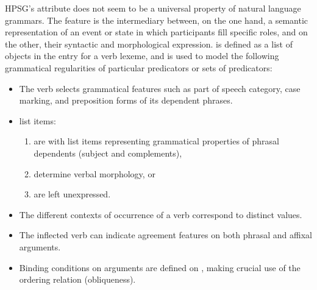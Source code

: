 \documentclass[output=paper
 	        ,biblatex
                ,babelshorthands
                ,newtxmath
                ,draftmode
                ,colorlinks, citecolor=brown
]{langscibook}
\begin{document}

HPSG's \argst attribute does not seem to be a universal property of natural
language grammars.  The \argst feature is the intermediary between, on
the one hand, a semantic representation of an event or state in which
participants fill specific roles, and on the other, their syntactic and
morphological expression.  \argst is defined as a list of 
objects in the entry for a verb lexeme, and is used to model the following grammatical regularities of particular predicators or sets of predicators:

\begin{itemize}
\item The verb selects grammatical features such as part of speech
category, case marking, and preposition forms of its dependent
phrases.
\item \argst list items:
\begin{enumerate}
\item are  with  list items
representing grammatical properties of phrasal dependents (subject and
complements),
\item determine verbal morphology, or
\item are left unexpressed.
\end{enumerate}
\item The different contexts of occurrence of a verb correspond to distinct \argst values.
\item The inflected verb can indicate agreement features on both phrasal
and affixal arguments.
\item Binding conditions on arguments are defined on \argst, making
crucial use of the ordering relation (obliqueness).
\end{itemize}
\end{document}
